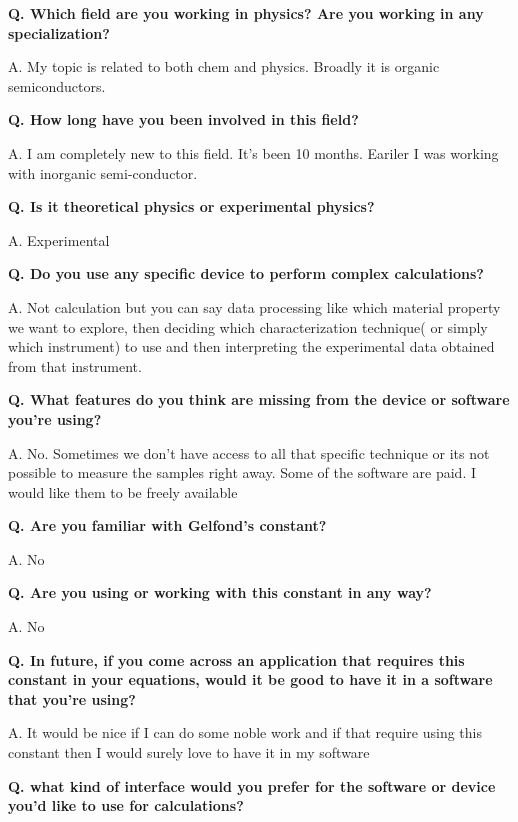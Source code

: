 \documentclass{article}
\begin{document}
\textbf{Q. Which field are you working in physics? Are you working in any specialization?}

A. My topic is related to both chem and physics. Broadly it is organic semiconductors.
\vspace{0.6em}

\textbf{Q. How long have you been involved in this field?}

A. I am completely new to this field. It's been 10 months. Eariler I was working with inorganic semi-conductor.
\vspace{0.6em}

\textbf{Q. Is it theoretical physics or experimental physics?}

A. Experimental
\vspace{0.6em}

\textbf{Q. Do you use any specific device to perform complex calculations?}

A. Not calculation but you can say data processing like which material property we want to explore, then deciding which characterization technique( or simply which instrument) to use and then interpreting the experimental data obtained from that instrument.
\vspace{0.6em}

\textbf{Q. What features do you think are missing from the device or software you're using?}

A. No. Sometimes we don’t have access to all that specific technique or its not possible to measure the samples right away. Some of the software are paid. I would like them to be freely available
\vspace{0.6em}

\textbf{Q. Are you familiar with Gelfond's constant?}

A. No
\vspace{0.6em}

\textbf{Q. Are you using or working with this constant in any way?}

A. No
\vspace{0.6em}

\textbf{Q. In future, if you come across an application that requires this constant in your equations, would it be good to have it in a software that you're using?}

A. It would be nice if I can do some noble work and if that require using this constant then I would surely love to have it in my software
\vspace{0.6em}

\textbf{Q. what kind of interface would you prefer for the software or device you'd like to use for calculations?}
\end{document}
